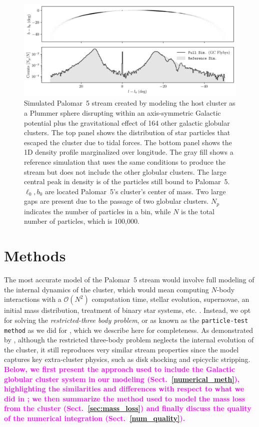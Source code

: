 \documentclass{aa}
\newcommand{\paola}[1]{\textcolor{magenta}{{#1}}}
\begin{document}
  \begin{figure}
    \centering
    \includegraphics[width=\linewidth]{stream_on_sky_Pal5_monte-carlo-009_pouliasis2017pii-GCNBody_pouliasis2017pii.png}
    \caption{Simulated Palomar~5 stream created by modeling the host cluster as a Plummer sphere disrupting within an axis-symmetric Galactic potential plus the gravitational effect of 164 other galactic globular clusters. The top panel shows the distribution of star particles that escaped the cluster due to tidal forces. The bottom panel shows the 1D density profile marginalized over longitude. The gray fill shows a reference simulation that uses the same conditions to produce the stream but does not include the other globular clusters. The large central peak in density is of the particles still bound to Palomar~5. $\ell_0,b_0$ are located Palomar~5's cluster's center of mass. Two large gaps are present due to the passage of two globular clusters. $N_p$ indicates the number of particles in a bin, while $N$ is the total number of particles, which is 100,000.}
    \label{fig:stream_on_sky}
    \end{figure}


\section{Methods}
  The most accurate model of the Palomar~5 stream would involve full modeling of the internal dynamics of the cluster, which would mean computing $N$-body interactions with a $\mathcal{O}(N^2)$ computation time, stellar evolution, supernovae, an initial mass distribution, treatment of binary star systems, etc. \citep[for such an example, see][]{2021NatAs...5..957G, 2016MNRAS.458.1450W}. Instead, we opt for solving the \textit{restricted-three body problem}, or as known as the \texttt{particle-test method} as we did for \citet{2023A&A...673A..44F}, which we describe here for completeness. As demonstrated by \citet{2012A&A...546L...7M}, although the restricted three-body problem neglects the internal evolution of the cluster, it still reproduces very similar stream properties since the model captures key extra-cluster physics, such as disk shocking and epicyclic stripping.\\
  \textbf{\paola{Below, we first present the approach used to include the Galactic globular cluster system in our modeling (Sect.~\ref{numerical_meth}), highlighting the similarities and differences with respect to what we did in \citet{2023A&A...673A..44F}; we then summarize the method used to model the mass loss from the cluster (Sect.~\ref{sec:mass_loss}) and finally discuss the quality of the numerical integration (Sect.~\ref{num_quality}). }}
\end{document}
